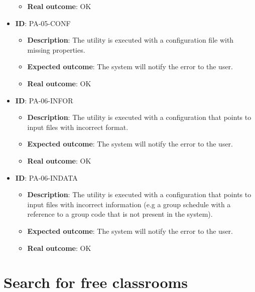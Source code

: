 \begin{itemize}
\begin{itemize}
            \item \textbf{Real outcome}: OK
        \end{itemize}
    \item \textbf{ID}: PA-05-CONF
        \begin{itemize}
            \item \textbf{Description}: The utility is executed with a configuration file with missing properties.
            \item \textbf{Expected outcome}: The system will notify the error to the user.
            \item \textbf{Real outcome}: OK
        \end{itemize}
    \item \textbf{ID}: PA-06-INFOR
        \begin{itemize}
            \item \textbf{Description}: The utility is executed with a configuration that points to input files with incorrect format.
            \item \textbf{Expected outcome}: The system will notify the error to the user.
            \item \textbf{Real outcome}: OK
        \end{itemize}
    \item \textbf{ID}: PA-06-INDATA
        \begin{itemize}
            \item \textbf{Description}: The utility is executed with a configuration that points to input files with incorrect information (e.g a group schedule with a reference to a group code that is not present in the system).
            \item \textbf{Expected outcome}: The system will notify the error to the user.
            \item \textbf{Real outcome}: OK
        \end{itemize}
\end{itemize}



\section{Search for free classrooms}

